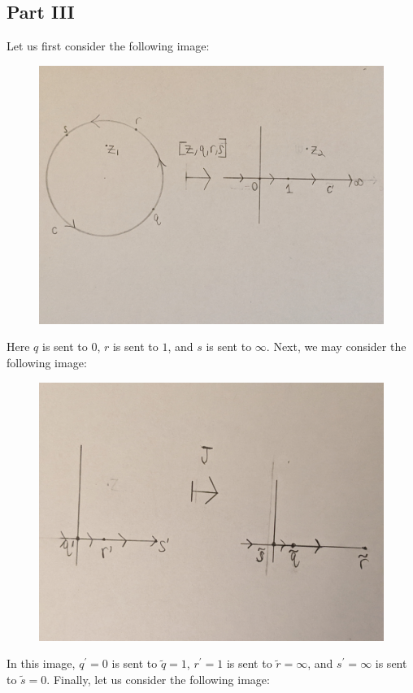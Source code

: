 \documentclass[12pt]{article}
\begin{document}
\subsection*{Part III}
Let us first consider the following image:
\begin{figure}[H]
\centering
\includegraphics[width=\textwidth]{Problem16Image1}
\end{figure} 
\noindent Here $q$ is sent to $0$, $r$ is sent to $1$, and $s$ is sent to $\infty$. Next, we may consider the following image:
\begin{figure}[H]
\centering
\includegraphics[width=\textwidth]{Problem16Image4}
\end{figure}
\noindent In this image, $q^\prime = 0$ is sent to $\tilde{q} = 1$, $r^\prime = 1$ is sent to $\tilde{r} = \infty$, and $s^\prime = \infty$ is sent to $\tilde{s} = 0$. Finally, let us consider the following image:
\end{document}
